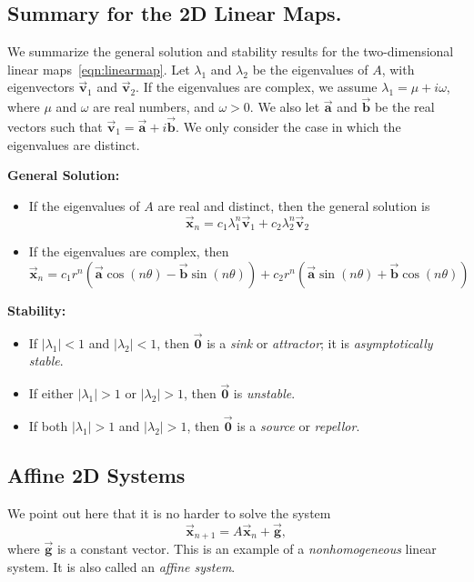 \documentclass[reqno]{immbook}
\newcommand{\BA}{\vec{\textbf{a}}}
\newcommand{\BB}{\vec{\textbf{b}}}
\newcommand{\BG}{\vec{\textbf{g}}}
\newcommand{\BV}{\vec{\textbf{v}}}
\newcommand{\BX}{\vec{\textbf{x}}}
\newcommand{\BZero}{\vec{\textbf{0}}}  %
\numberwithin{equation}{chapter}
\numberwithin{question}{section}
\numberwithin{theorem}{chapter}
\numberwithin{figure}{chapter}
\theoremstyle{definition}
\begin{document}
\subsection*{Summary for the 2D Linear Maps.}
We summarize the general solution and stability results
for the two-dimensional linear maps~\eqref{eqn:linearmap}.
Let $\lambda_1$ and $\lambda_2$ be the eigenvalues of
$A$, with eigenvectors $\BV_1$ and $\BV_2$.
If the eigenvalues are complex, we assume
$\lambda_1 = \mu+i\omega$, where $\mu$ and $\omega$
are real numbers, and $\omega > 0$.  We also let $\BA$ and $\BB$
be the real vectors such that $\BV_1 = \BA+i\BB$.
We only consider the case in which the eigenvalues are distinct. 

\medskip
\noindent
\textbf{General Solution:}
\begin{itemize}
\item If the eigenvalues of $A$ are real and distinct, then the
general solution is
\begin{equation}
   \BX_n = c_1 \lambda_1^n \BV_1 + c_2 \lambda_2^n \BV_2
\end{equation}
\item If the eigenvalues are complex, then
\begin{equation}
  \BX_n =    c_1 r^n(\BA\cos(n\theta)-\BB\sin(n\theta))
           + c_2 r^n(\BA\sin(n\theta)+\BB\cos(n\theta))
\end{equation}
\end{itemize}

\noindent
\textbf{Stability:}
\begin{itemize}
\item If $|\lambda_1| < 1$ and $|\lambda_2| < 1$, then
$\BZero$ is a \emph{sink} or \emph{attractor}; it is
\emph{asymptotically stable}.
\item If either $|\lambda_1| > 1$ or $|\lambda_2|>1$, then
$\BZero$ is \emph{unstable}.
\item If both $|\lambda_1| > 1$ and $|\lambda_2|>1$, then
$\BZero$ is a \emph{source} or \emph{repellor}.
\end{itemize}

\subsection*{Affine 2D Systems}
We point out here that it is no harder to solve the
system
\begin{equation}
  \BX_{n+1} = A\BX_n + \BG,
  \label{eqn:affine}
\end{equation}
where $\BG$ is a constant vector.
This is an example of a \emph{nonhomogeneous}
linear system.  It is also called an \emph{affine system}.
\end{document}
